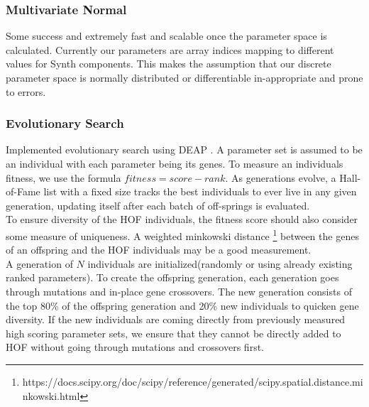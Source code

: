 \documentclass{nime-alternate} %
\begin{document}
\subsubsection{Multivariate Normal}
Some success and extremely fast and scalable once the parameter space is calculated. Currently our parameters are array indices mapping to different values for Synth components. This makes the assumption that our discrete parameter space is normally distributed or differentiable in-appropriate and prone to errors. 

\subsubsection{Evolutionary Search}
Implemented evolutionary search using DEAP \citep{DEAP_JMLR2012}. A parameter set is assumed to be an individual with each parameter being its genes. To measure an individuals fitness, we use the formula $fitness=score-rank$. As generations evolve, a Hall-of-Fame list with a fixed size tracks the best individuals to ever live in any given generation, updating itself after each batch of off-springs is evaluated.\\
To ensure diversity of the HOF individuals, the fitness score should also consider some measure of uniqueness. A weighted minkowski distance \footnote{https://docs.scipy.org/doc/scipy/reference/generated/scipy.spatial.distance.minkowski.html} between the genes of an offspring and the HOF individuals may be a good measurement.\\
A generation of $N$ individuals are initialized(randomly or using already existing ranked parameters). To create the offspring generation, each generation goes through mutations and in-place gene crossovers. The new generation consists of the top 80\% of the offspring generation and 20\% new individuals to quicken gene diversity. If the new individuals are coming directly from previously measured high scoring parameter sets, we ensure that they cannot be directly added to HOF without going through mutations and crossovers first. 



     
\end{document}
